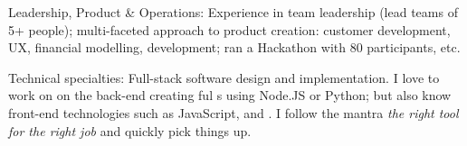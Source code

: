 \documentclass[10pt,a4paper]{article}
\begin{document}
\inlineheadsection  %
  {Leadership, Product \& Operations:}
  {Experience in team leadership (lead teams of 5+ people); multi-faceted approach to product creation: customer development, UX, financial modelling, development; ran a Hackathon with 80 participants, etc.}

\inlineheadsection  %
  {Technical specialties:}
  {Full-stack software design and implementation. I love to work on on the back-end creating ful s using Node.JS or Python; but also know front-end technologies such as JavaScript,  and . I follow the mantra \emph{the right tool for the right job} and quickly pick things up.}

\spacedhrule{1.5em}{-0.4em}

\end{document}
